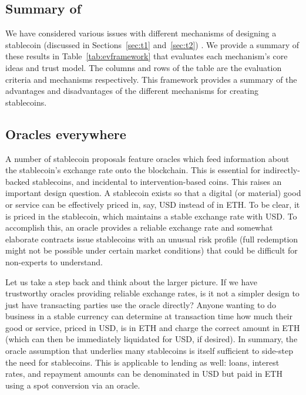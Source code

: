 
\subsection{Summary of }

We have considered various issues with different mechanisms of designing a stablecoin (discussed in Sections~\ref{sec:t1} and~\ref{sec:t2}) . We provide a summary of these results in  Table~\ref{tab:evframework} that evaluates each mechanism's core ideas and trust model. The columns and rows of the table are the evaluation criteria and mechanisms respectively. This framework provides a summary of the advantages and disadvantages of the different mechanisms for creating stablecoins.





\subsection{Oracles everywhere}

A number of stablecoin proposals feature oracles which feed information about the stablecoin's exchange rate onto the blockchain. This is essential for indirectly-backed stablecoins, and incidental to intervention-based coins. This raises an important design question. A stablecoin exists so that a digital (or material) good or service can be effectively priced in, say, USD instead of in ETH. To be clear, it is priced in the stablecoin, which maintains a stable exchange rate with USD. To accomplish this, an oracle provides a reliable exchange rate and somewhat elaborate contracts issue stablecoins with an unusual risk profile (\eg full redemption might not be possible under certain market conditions) that could be difficult for non-experts to understand.

Let us take a step back and think about the larger picture. If we have trustworthy oracles providing reliable exchange rates, is it not a simpler design to just have transacting parties use the oracle directly? Anyone wanting to do business in a stable currency can determine at transaction time how much their good or service, priced in USD, is in ETH and charge the correct amount in ETH (which can then be immediately liquidated for USD, if desired). In summary, the oracle assumption that underlies many stablecoins is itself sufficient to side-step the need for stablecoins. This is applicable to lending as well: loans, interest rates, and repayment amounts can be denominated in USD but paid in ETH using a spot conversion via an oracle.

